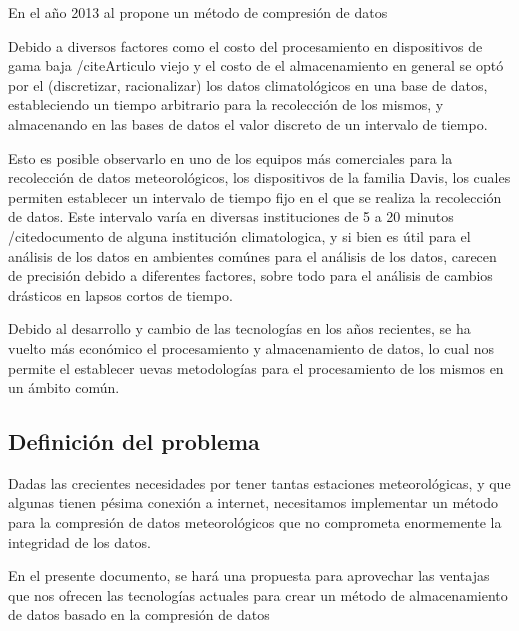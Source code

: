 En el año 2013 al \cite{Improved_Stanchev} propone un método de compresión de datos


Debido a diversos factores como el costo del procesamiento en dispositivos de gama baja /cite{Articulo viejo} y el costo de el almacenamiento en general \cite{Marshall_1994} se optó por el (discretizar, racionalizar) los datos climatológicos en una base de datos, estableciendo un tiempo arbitrario para la recolección de los mismos, y almacenando en las bases de datos el valor discreto de un intervalo de tiempo.

Esto es posible observarlo en uno de los equipos más comerciales para la recolección de datos meteorológicos, los dispositivos de la familia Davis, los cuales permiten establecer un intervalo de tiempo fijo en el que se realiza la recolección de datos. Este intervalo varía en diversas instituciones de 5 a 20 minutos /cite{documento de alguna institución climatologica}, y si bien es útil para el análisis de los datos en ambientes comúnes para el análisis de los datos, carecen de precisión debido a diferentes factores, sobre todo para el análisis de cambios drásticos en lapsos cortos de tiempo.

Debido al desarrollo y cambio de las tecnologías en los años recientes, se ha vuelto más económico el procesamiento y almacenamiento de datos, lo cual nos permite el establecer uevas metodologías para el procesamiento de los mismos en un ámbito común.

\subsection{Definición del problema}

Dadas las crecientes necesidades por tener tantas estaciones meteorológicas, y que algunas tienen pésima conexión a internet, necesitamos implementar un método para la compresión de datos meteorológicos que no comprometa enormemente la integridad de los datos.

En el presente documento, se hará una propuesta para aprovechar las ventajas que nos ofrecen las tecnologías actuales para crear un método de almacenamiento de datos basado en la compresión de datos


